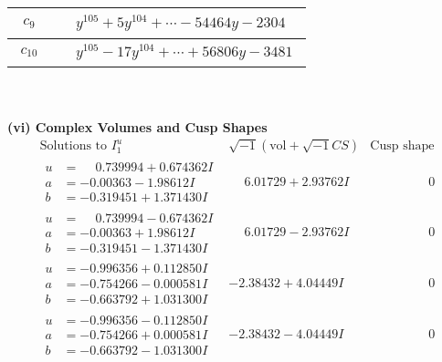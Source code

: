 \documentclass[1p]{elsarticle_modified}
\theoremstyle{definition}
\newcommand{\I}{\sqrt{-1}}
\begin{document}
\begin{tabular}{m{50pt}|m{274pt}}
\hline $$\begin{aligned}c_{9}\end{aligned}$$&$\begin{aligned}
&y^{105}+5 y^{104}+\cdots-54464 y-2304
\end{aligned}$\\
\hline $$\begin{aligned}c_{10}\end{aligned}$$&$\begin{aligned}
&y^{105}-17 y^{104}+\cdots+56806 y-3481
\end{aligned}$\\
\hline
\end{tabular}\\~\\
\newpage\flushleft \textbf{(vi) Complex Volumes and Cusp Shapes}
$$\begin{array}{c|c|c}  
\text{Solutions to }I^u_{1}& \I (\text{vol} + \sqrt{-1}CS) & \text{Cusp shape}\\
 \hline 
\begin{aligned}
u &= \phantom{-}0.739994 + 0.674362 I \\
a &= -0.00363 - 1.98612 I \\
b &= -0.319451 + 1.371430 I\end{aligned}
 & \phantom{-}6.01729 + 2.93762 I & \phantom{-0.000000 } 0 \\ \hline\begin{aligned}
u &= \phantom{-}0.739994 - 0.674362 I \\
a &= -0.00363 + 1.98612 I \\
b &= -0.319451 - 1.371430 I\end{aligned}
 & \phantom{-}6.01729 - 2.93762 I & \phantom{-0.000000 } 0 \\ \hline\begin{aligned}
u &= -0.996356 + 0.112850 I \\
a &= -0.754266 - 0.000581 I \\
b &= -0.663792 + 1.031300 I\end{aligned}
 & -2.38432 + 4.04449 I & \phantom{-0.000000 } 0 \\ \hline\begin{aligned}
u &= -0.996356 - 0.112850 I \\
a &= -0.754266 + 0.000581 I \\
b &= -0.663792 - 1.031300 I\end{aligned}
 & -2.38432 - 4.04449 I & \phantom{-0.000000 } 0 \\ \hline\begin{aligned}

\end{aligned}
\end{array}$$
\end{document}
